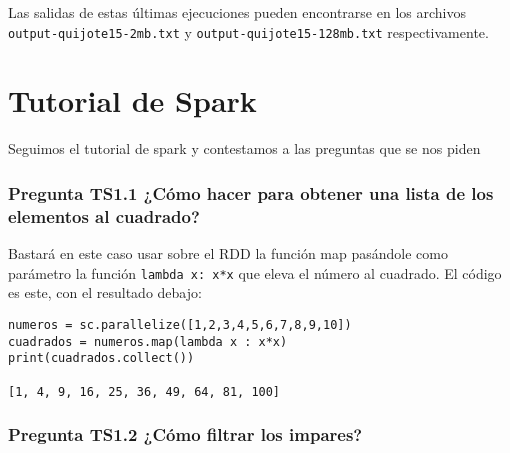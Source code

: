\documentclass[11pt]{article}
\def\inline{\lstinline[basicstyle=\ttfamily,keywordstyle={}]}
\begin{document}
Las salidas de estas últimas ejecuciones pueden encontrarse en los archivos \inline{output-quijote15-2mb.txt} y \inline{output-quijote15-128mb.txt} respectivamente.

\newpage

\section{ Tutorial de Spark}

Seguimos el tutorial de spark y contestamos a las preguntas que se nos piden


\subsubsection*{ Pregunta TS1.1 ¿Cómo hacer para obtener una lista de los elementos al cuadrado?}

Bastará en este caso usar sobre el RDD la función map pasándole como parámetro la función  \inline{lambda x: x*x} que eleva el número al cuadrado. El código es este, con el resultado debajo:

\begin{verbatim}
numeros = sc.parallelize([1,2,3,4,5,6,7,8,9,10])
cuadrados = numeros.map(lambda x : x*x)
print(cuadrados.collect())

[1, 4, 9, 16, 25, 36, 49, 64, 81, 100]
\end{verbatim}
\subsubsection*{ Pregunta TS1.2 ¿Cómo filtrar los impares? }
\end{document}
